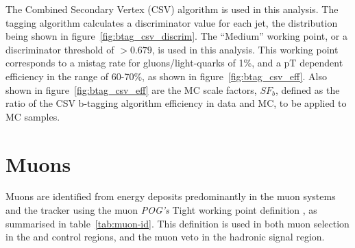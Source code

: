 The Combined Secondary Vertex (CSV) algorithm \cite{CMS-PAS-BTV-12-001} is used
in this analysis. The tagging algorithm calculates a discriminator value for
each jet, the distribution being shown in figure~\ref{fig:btag_csv_discrim}.
The ``Medium'' working point, or a discriminator
threshold of $>0.679$, is used in this analysis. This working point corresponds
to a mistag rate for gluons/light-quarks of 1\%, and a pT dependent efficiency
in the range of 60-70\%, as shown in figure~\ref{fig:btag_csv_eff}. Also
shown in figure~\ref{fig:btag_csv_eff} are the MC scale factors, $SF_b$, defined
as the ratio of the CSV b-tagging algorithm efficiency in data and MC, to be
applied to MC samples.


\section{Muons}  %
\label{sec:objects_muons}
Muons are identified from energy deposits predominantly in the muon systems and
the tracker using the muon \emph {POG's} Tight working point definition
\cite{ref:muon-id}, as summarised in table~\ref{tab:muon-id}. This definition is
used in both muon selection in the \mj and \mmj control regions, and the muon
veto in the hadronic signal region.
